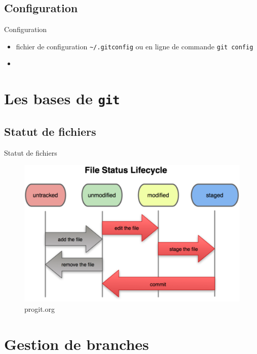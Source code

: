 \documentclass{beamer}
\newcommand{\git}{\texttt{git}}
\begin{document}
\subsection*{Configuration}
\begin{frame}[containsverbatim]{Configuration}
  \begin{itemize}
  \item fichier de configuration \lstinline|~/.gitconfig| ou en ligne de commande \lstinline|git config|
  \item
  \end{itemize}
\end{frame}

\section{Les bases de \git}
\subsection*{Statut de fichiers}
\begin{frame}{Statut de fichiers}
  \begin{figure}
    \begin{center}
      \includegraphics[scale=0.7]{img/Status_lifecycle.png}
    \end{center}
    \caption{progit.org}
  \end{figure}
\end{frame}


\section{Gestion de branches}
\end{document}
